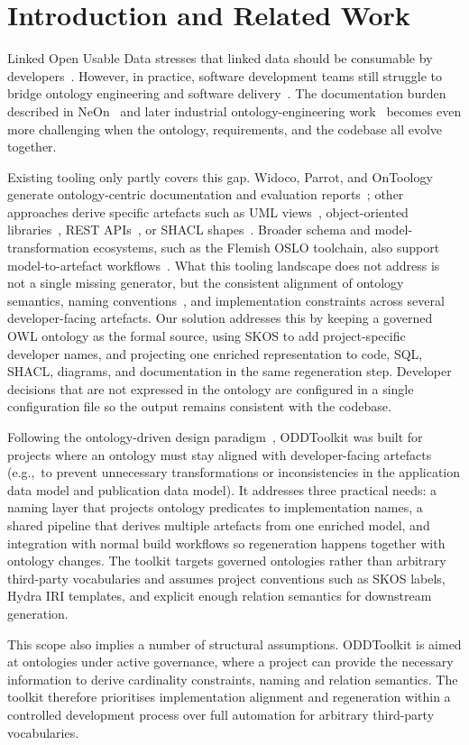 \section{Introduction and Related Work} \label{sec:introduction}
Linked Open Usable Data stresses that linked data should be consumable by developers~\cite{newbury2018loud}. However, in practice, software development teams still struggle to bridge ontology engineering and software delivery~\cite{9963753,avila2020applications}. The documentation burden described in NeOn~\cite{suarez2012neon} and later industrial ontology-engineering work~\cite{poveda2022lot} becomes even more challenging when the ontology, requirements, and the codebase all evolve together.

Existing tooling only partly covers this gap. Widoco, Parrot, and OnToology generate ontology-centric documentation and evaluation reports~\cite{garijo2017widoco,parrot,alobaid2018ontoology}; other approaches derive specific artefacts such as UML views~\cite{ROBLES201272}, object-oriented libraries~\cite{elkaed2017olga}, REST APIs~\cite{espinoza2022extending}, or SHACL shapes~\cite{cimmino2020astrea}. Broader schema and model-transformation ecosystems, such as the Flemish OSLO toolchain, also support model-to-artefact workflows~\cite{10.1093/gigascience/giaf152,osloUmlTransformer2026,opTedModel2owl2026}. What this tooling landscape does not address is not a single missing generator, but the consistent alignment of ontology semantics, naming conventions~\cite{7332450,10.1007/978-3-030-38919-2_35}, and implementation constraints across several developer-facing artefacts. Our solution addresses this by keeping a governed OWL ontology as the formal source, using SKOS to add project-specific developer names, and projecting one enriched representation to code, SQL, SHACL, diagrams, and documentation in the same regeneration step. Developer decisions that are not expressed in the ontology are configured in a single configuration file so the output remains consistent with the codebase.

Following the ontology-driven design paradigm~\cite{6011704}, ODDToolkit was built for projects where an ontology must stay aligned with developer-facing artefacts (e.g.,~to prevent unnecessary transformations or inconsistencies in the application data model and publication data model). It addresses three practical needs: a naming layer that projects ontology predicates to implementation names, a shared pipeline that derives multiple artefacts from one enriched model, and integration with normal build workflows so regeneration happens together with ontology changes. The toolkit targets governed ontologies rather than arbitrary third-party vocabularies and assumes project conventions such as SKOS labels, Hydra IRI templates, and explicit enough relation semantics for downstream generation.

This scope also implies a number of structural assumptions. ODDToolkit is aimed at ontologies under active governance, where a project can provide the necessary information to derive cardinality constraints, naming and relation semantics. The toolkit therefore prioritises implementation alignment and regeneration within a controlled development process over full automation for arbitrary third-party vocabularies.